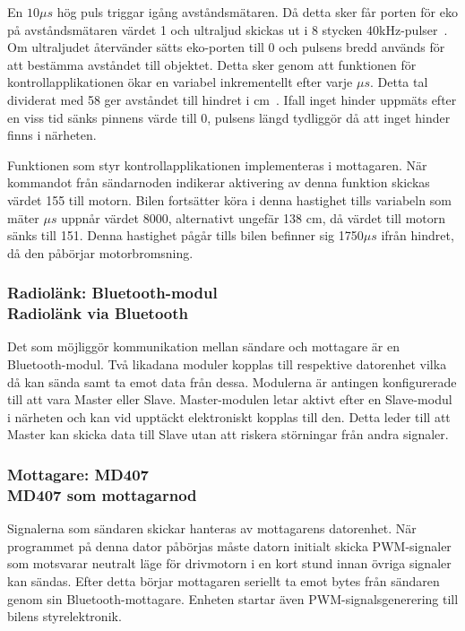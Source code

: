 \documentclass[a4paper]{article}
\begin{document}
\vspace{5mm} \noindent
En $10\mu s$ hög puls triggar igång avståndsmätaren. Då detta sker får porten för eko på avståndsmätaren värdet 1 och ultraljud skickas ut i 8 stycken 40kHz-pulser~\cite{DistMeasure}. Om ultraljudet återvänder sätts eko-porten till 0 och pulsens bredd används för att bestämma avståndet till objektet. Detta sker genom att funktionen för kontrollapplikationen ökar en variabel inkrementellt efter varje $\mu s$. Detta tal dividerat med 58 ger avståndet till hindret i cm~\cite{DistMeasure}. Ifall inget hinder uppmäts efter en viss tid sänks pinnens värde till 0, pulsens längd tydliggör då att inget hinder finns i närheten.

\vspace{5mm} \noindent
Funktionen som styr kontrollapplikationen implementeras i mottagaren. När kommandot från sändarnoden indikerar aktivering av denna funktion skickas värdet 155 till motorn. Bilen fortsätter köra i denna hastighet tills variabeln som mäter $\mu s$ uppnår värdet 8000, alternativt ungefär 138 cm, då värdet till motorn sänks till 151. Denna hastighet pågår tills bilen befinner sig 1750$\mu s$ ifrån hindret, då den påbörjar motorbromsning.


\subsubsection{Radiolänk: Bluetooth-modul \\ Radiolänk via Bluetooth}
Det som möjliggör kommunikation mellan sändare och mottagare är en Bluetooth-modul. Två likadana moduler kopplas till respektive datorenhet vilka då kan sända samt ta emot data från dessa. Modulerna är antingen konfigurerade till att vara Master eller Slave. Master-modulen letar aktivt efter en Slave-modul i närheten och kan vid upptäckt elektroniskt kopplas till den. Detta leder till att Master kan skicka data till Slave utan att riskera störningar från andra signaler.


\subsubsection{Mottagare: MD407 \\ MD407 som mottagarnod}
Signalerna som sändaren skickar hanteras av mottagarens datorenhet. När programmet på denna dator påbörjas måste datorn initialt skicka PWM-signaler som motsvarar neutralt läge för drivmotorn i en kort stund innan övriga signaler kan sändas. Efter detta börjar mottagaren seriellt ta emot bytes från sändaren genom sin Bluetooth-mottagare. Enheten startar även PWM-signalsgenerering till bilens styrelektronik. 
\end{document}
